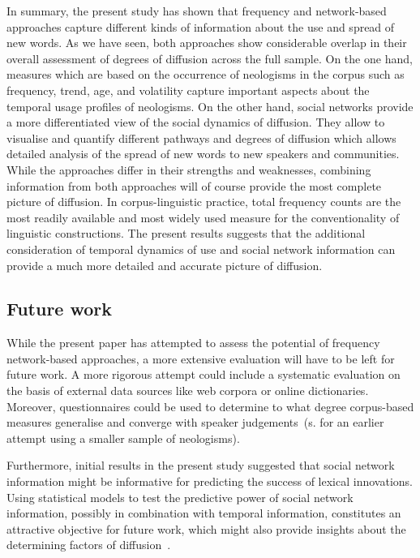 \documentclass[
  a4paper,
  abstract=on,
  captions=tableabove
  ]{scrartcl}
\begin{document}
    In summary, the present study has shown that frequency and network-based approaches capture different kinds of information about the use and spread of new words. As we have seen, both approaches show considerable overlap in their overall assessment of degrees of diffusion across the full sample. On the one hand, measures which are based on the occurrence of neologisms in the corpus such as frequency, trend, age, and volatility capture important aspects about the temporal usage profiles of neologisms. On the other hand, social networks provide a more differentiated view of the social dynamics of diffusion. They allow to visualise and quantify different pathways and degrees of diffusion which allows detailed analysis of the spread of new words to new speakers and communities. While the approaches differ in their strengths and weaknesses, combining information from both approaches will of course provide the most complete picture of diffusion. In corpus-linguistic practice, total frequency counts are the most readily available and most widely used measure for the conventionality of linguistic constructions. The present results suggests that the additional consideration of temporal dynamics of use and social network information can provide a much more detailed and accurate picture of diffusion.


  \subsection{Future work}
  
    While the present paper has attempted to assess the potential of frequency network-based approaches, a more extensive evaluation will have to be left for future work. A more rigorous attempt could include a systematic evaluation on the basis of external data sources like web corpora or online dictionaries. Moreover, questionnaires could be used to determine to what degree corpus-based measures generalise and converge with speaker judgements~(s. \textcite{Kerremans2015WebNew} for an earlier attempt using a smaller sample of neologisms).

    Furthermore, initial results in the present study suggested that social network information might be informative for predicting the success of lexical innovations. Using statistical models to test the predictive power of social network information, possibly in combination with temporal information, constitutes an attractive objective for future work, which might also provide insights about the determining factors of diffusion~\parencite{Ryskina2020WhereNew, Stewart2018MakingFetch}.  
\end{document}
